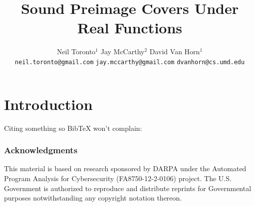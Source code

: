 \documentclass{llncs}
\title{Sound Preimage Covers Under Real Functions}
\author{\tab\tab Neil Toronto$^1$ \tab\tab\tab\tab\tab Jay McCarthy$^2$ \tab\tab\tab David Van Horn$^1$ \\
\footnotesize{\texttt{neil.toronto@gmail.com} \tab \texttt{jay.mccarthy@gmail.com} \tab \texttt{dvanhorn@cs.umd.edu}}}
\institute{$^1$University of Maryland \tab $^2$Vassar College}
\date{}
\begin{document}
\maketitle

\begin{abstract}
\end{abstract}

\keywords 



\section{Introduction}

Citing something so BibTeX won't complain: \cite{cit:toronto-thesis}

\subsubsection*{Acknowledgments}
This material is based on research sponsored by DARPA under the
Automated Program Analysis for Cybersecurity (FA8750-12-2-0106)
project. The U.S. Government is authorized to reproduce and distribute
reprints for Governmental purposes notwithstanding any copyright
notation thereon.




\end{document}
